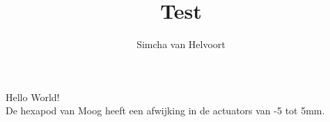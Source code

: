 \documentclass[11pt]{article}
\begin{document}
\title{Test}
\author{Simcha van Helvoort}
\maketitle{}
Hello World!\\
De hexapod van Moog heeft een afwijking in de actuators van -5 tot 5mm.
\end{document}

